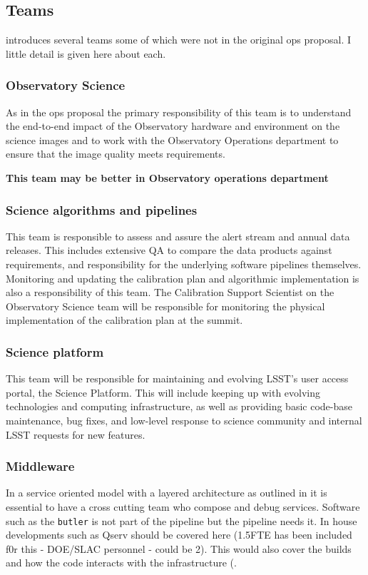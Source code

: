 
\subsection{Teams }\label{sec:teams}
 introduces several teams some of which were not in the original ops proposal. I  little detail is given here about each.

\subsubsection{Observatory Science}
As in the ops proposal the primary responsibility of this team is to understand the end-to-end impact of the Observatory hardware and environment on the science images and to work with the Observatory Operations department to ensure that the image quality meets requirements.

\textbf{This team may be better  in Observatory operations department }

\subsubsection{Science algorithms and pipelines}
This team is responsible to assess and assure the alert stream and annual data releases. This includes extensive \gls{QA} to compare the data products against requirements, and responsibility for the underlying \gls{software} pipelines themselves. Monitoring and updating the calibration plan and algorithmic implementation is also a responsibility of this team. The Calibration Support Scientist on the Observatory Science team will be responsible for monitoring the physical implementation of the calibration plan at the summit.

\subsubsection{Science platform  }
This team will be responsible for maintaining and evolving LSST’s user access portal, the Science Platform. This will include keeping up with evolving technologies and computing infrastructure, as well as providing basic code-base maintenance, bug fixes, and low-level response to science community and internal \gls{LSST} requests for new features.

\subsubsection{Middleware }
In a service oriented model with a layered architecture as outlined in  it is essential to have a cross cutting team who compose and debug services.
Software such as the \texttt{butler}  is not part of the pipeline but the pipeline needs it. In house developments such as \gls{Qserv} should be covered here (1.5FTE has been included f0r this - DOE/SLAC personnel - could be 2).
This would also cover the builds and how the code interacts with the infrastructure (.

